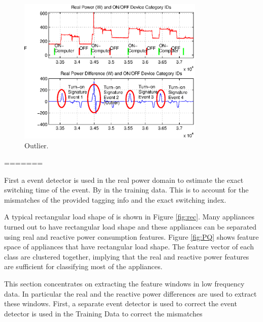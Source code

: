 \documentclass[conference]{IEEEtran}
\begin{document}
	\begin{figure}[!t]
		\centering
		\includegraphics[width=3.5in]{fig/outlier.eps}
		\caption{Outlier.}
		\label{fig:outlier}
	\end{figure}
	\newpage
	=======
	
	
	
	First a event detector is used in the real power domain to estimate the exact switching time of the event.  By  in the training data.  This is to account for the mismatches of the provided tagging info and the exact switching index.  
	
	A typical rectangular load shape of is shown in Figure \ref{fig:rec}.  Many appliances turned out to have rectangular load shape and these appliances can be separated using real and reactive power consumption features.  Figure \ref{fig:PQ} shows feature space of appliances that have rectangular load shape.  The feature vector of each class are clustered together, implying that the real and reactive power features are sufficient for classifying most of the appliances.
	
	
	This section concentrates on extracting the feature windows in low frequency data.  In particular the real and the reactive power differences are used to extract these windows.  First, a separate event detector is used to correct the   event detector is used in the Training Data to correct the mismatches 
	
\end{document}
